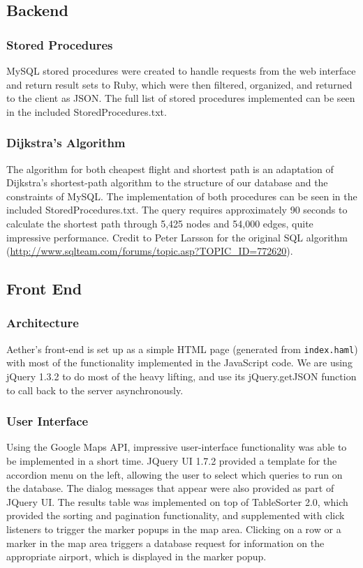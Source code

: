 \subsection{Backend}

\subsubsection{Stored Procedures}
MySQL stored procedures were created to handle requests from the web interface and return result sets to Ruby, which were then filtered, organized, and returned to the client as JSON. The full list of stored procedures implemented can be seen in the included StoredProcedures.txt.

\subsubsection{Dijkstra's Algorithm}
The algorithm for both cheapest flight and shortest path is an adaptation of Dijkstra's shortest-path algorithm to the structure of our database and the constraints of MySQL. The implementation of both procedures can be seen in the included StoredProcedures.txt.  The query requires approximately 90 seconds to calculate the shortest path through 5,425 nodes and 54,000 edges, quite impressive performance. Credit to Peter Larsson for the original SQL algorithm (\mbox{\url{http://www.sqlteam.com/forums/topic.asp?TOPIC_ID=772620}}).

\subsection{Front End}
\subsubsection{Architecture}
Aether's front-end is set up as a simple HTML page (generated from \verb!index.haml!) with most of the functionality implemented in the JavaScript code. We are using jQuery 1.3.2 to do most of the heavy lifting, and use its jQuery.getJSON function to call back to the server asynchronously.

\subsubsection{User Interface}
Using the Google Maps API, impressive user-interface functionality was able to be implemented in a short time. JQuery UI 1.7.2 provided a template for the accordion menu on the left, allowing the user to select which queries to run on the database. The dialog messages that appear were also provided as part of JQuery UI. The results table was implemented on top of TableSorter 2.0, which provided the sorting and pagination functionality, and supplemented with click listeners to trigger the marker popups in the map area. Clicking on a row or a marker in the map area triggers a database request for information on the appropriate airport, which is displayed in the marker popup.

